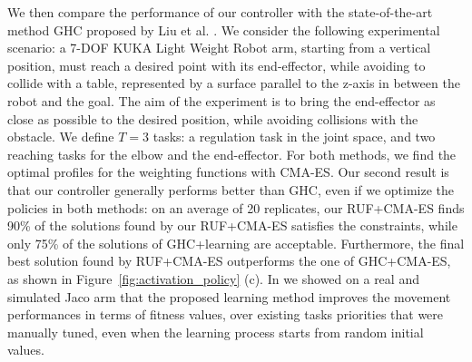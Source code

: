 \documentclass[final,5p,twocolumn]{elsarticle}
\begin{document}
We then compare the performance of our controller with the state-of-the-art
method GHC proposed by Liu et al. \cite{liuGHC2015}. We consider the
following experimental scenario: a 7-DOF KUKA Light Weight Robot arm, starting
from a vertical position, must reach a desired point with its end-effector,
while avoiding to collide with a table, represented by a surface parallel to the
z-axis in between the robot and the goal. The aim of the experiment is to bring
the end-effector as close as possible to the desired position, while avoiding
collisions with the obstacle. We define  $T=3$ tasks: a regulation task in the
joint space, and two reaching tasks for the elbow and the end-effector. For both
methods, we find the optimal profiles for the weighting functions with CMA-ES.
Our second result is that our controller generally performs better than GHC,
even if we optimize the policies in both methods: on an average of 20
replicates, our RUF+CMA-ES finds 90\% of the solutions found by our RUF+CMA-ES
satisfies the constraints, while only 75\% of the solutions of GHC+learning are
acceptable. Furthermore, the final best solution found by RUF+CMA-ES outperforms
the one of GHC+CMA-ES, as shown in Figure~\ref{fig:activation_policy} (c).
In \cite{Modugno2016} we showed on a real and simulated Jaco arm that the proposed 
learning method improves the movement performances in terms of fitness values, over 
existing tasks priorities that were manually tuned, even when the learning process
starts from random initial values.
\end{document}
